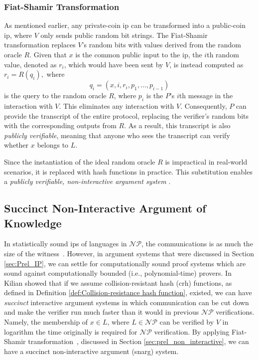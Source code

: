 \subsubsection{Fiat-Shamir Transformation}
As mentioned earlier, any private-coin \gls{ip} can be transformed into a public-coin \gls{ip}, where \( V \) only sends public random bit strings. The Fiat-Shamir transformation replaces \( V \)'s random bits with values derived from the random oracle \( R \). Given that \( x \) is the common public input to the \gls{ip}, the \( i \)th random value, denoted as \( r_i \), which would have been sent by \( V \), is instead computed as 
\(
r_i = R(q_i),
\)
where 
\[
q_i = (x, i, r_i, p_1, \dots, p_{i-1}) 
\]
is the query to the random oracle \( R \), where $p_i$ is the $P$'s $i$th message in the interaction with $V$. This eliminates any interaction with \( V \). Consequently, \( P \) can provide the transcript of the entire protocol, replacing the verifier's random bits with the corresponding outputs from \( R \). As a result, this transcript is also \textit{publicly verifiable}, meaning that anyone who sees the transcript can verify whether \( x \) belongs to \( L \).

Since the instantiation of the ideal random oracle \( R \) is impractical in real-world scenarios, it is replaced with hash functions in practice. This substitution enables a \textit{publicly verifiable, non-interactive argument system} \cite{Thaler2022Proofs}.

\subsection{Succinct Non-Interactive Argument of Knowledge}

In statistically sound \gls{ip}s of languages in $\mathcal{NP}$, the communications is as much the size of the witness~\cite{Nitulescu2019Lattice}. However, in argument systems that were discussed in Section \ref{sec:Prel_IP}, we can settle for computationally sound proof systems which are sound against computationally bounded (i.e., polynomial-time) provers. In~\cite{Kilian1992} Kilian showed that if we assume collision-resistant hash (\gls{crh}) functions, as defined in Definition \ref{def:Collision-resistance hash function}, existed, we can have \textit{succinct} interactive argument systems in which communication can be cut down and make the verifier run much faster than it would in previous $\mathcal{NP}$ verifications. Namely, the membership of $x \in L$, where $L \in \mathcal{NP}$ can be verified by $V$ in logarithm the time originally is required for  $\mathcal{NP}$ verification. By applying Fiat-Shamir transformation~\cite{Fiat1987}, discussed in Section \ref{sec:prel_non_interactive},  we can have a succinct non-interactive argument (\gls{snarg}) system.

